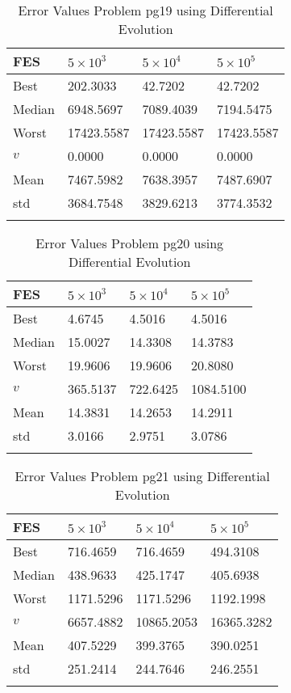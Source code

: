 \documentclass[10pt, a4paper]{book}
\begin{document}
\begin{center}
\begin{longtable}{l l l l}
FES & $5 \times 10^{3}$ & $5 \times 10^{4}$ & $5 \times 10^{5}$ \\
\hline
Best & 202.3033 & 42.7202 & 42.7202 \\
Median & 6948.5697 & 7089.4039 & 7194.5475 \\
Worst & 17423.5587 & 17423.5587 & 17423.5587 \\
$v$ & 0.0000 & 0.0000 & 0.0000 \\
Mean & 7467.5982 & 7638.3957 & 7487.6907 \\
std & 3684.7548 & 3829.6213 & 3774.3532 \\
\caption{ Error Values Problem pg19 using Differential Evolution }
\end{longtable}
\end{center}

\begin{center}
\begin{longtable}{l l l l}
FES & $5 \times 10^{3}$ & $5 \times 10^{4}$ & $5 \times 10^{5}$ \\
\hline
Best & 4.6745 & 4.5016 & 4.5016 \\
Median & 15.0027 & 14.3308 & 14.3783 \\
Worst & 19.9606 & 19.9606 & 20.8080 \\
$v$ & 365.5137 & 722.6425 & 1084.5100 \\
Mean & 14.3831 & 14.2653 & 14.2911 \\
std & 3.0166 & 2.9751 & 3.0786 \\
\caption{ Error Values Problem pg20 using Differential Evolution }
\end{longtable}
\end{center}

\begin{center}
\begin{longtable}{l l l l}
FES & $5 \times 10^{3}$ & $5 \times 10^{4}$ & $5 \times 10^{5}$ \\
\hline
Best & 716.4659 & 716.4659 & 494.3108 \\
Median & 438.9633 & 425.1747 & 405.6938 \\
Worst & 1171.5296 & 1171.5296 & 1192.1998 \\
$v$ & 6657.4882 & 10865.2053 & 16365.3282 \\
Mean & 407.5229 & 399.3765 & 390.0251 \\
std & 251.2414 & 244.7646 & 246.2551 \\
\caption{ Error Values Problem pg21 using Differential Evolution }
\end{longtable}
\end{center}
\end{document}
